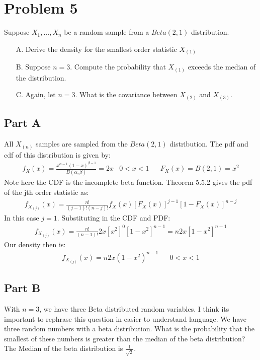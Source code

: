 \documentclass{article}
\begin{document}
\clearpage
\section*{Problem 5}
Suppose $X_1,...,X_n$ be a random sample from a $Beta(2,1)$ distribution.
\begin{enumerate}
\item[A.] Derive the density for the smallest order statistic $X_{(1)}$
\item[B.] Suppose $n = 3$. Compute the probability that $X_{(1)}$ exceeds the median of the distribution.
\item[C.] Again, let $n = 3$. What is the covariance between $X_{(2)}$ and $X_{(3)}$.

\end{enumerate}

\subsection*{Part A}
All $X_{(n)}$ samples are sampled from the $Beta(2,1)$ distribution. The pdf and cdf of this distribution is given by:
\begin{align*}
f_X(x) = \frac{x^{\alpha-1}(1-x)^{\beta-1}}{B(\alpha,\beta)} = 2x & 0<x<1 && F_X(x) = B(2,1) = x^2
\end{align*}
Note here the CDF is the incomplete beta function. Theorem 5.5.2 gives the pdf of the jth order statistic as:
\begin{align*}
f_{X_{(j)}}(x) = \frac{n!}{(j-1)!(n-j)!} f_X(x) [F_X(x)]^{j-1} [1-F_X(x)]^{n-j}
\end{align*}
In this case $j=1$. Substituting in the CDF and PDF:
\begin{align*}
f_{X_{(j)}}(x) = \frac{n!}{(n-1)!} 2x [x^2]^{0} [1-x^2]^{n-1} = n 2x [1-x^2]^{n-1}
\end{align*}
Our density then is:
\begin{align*}
\boxed{ f_{X_{(j)}}(x) = n 2x (1-x^2)^{n-1} } && 0<x<1
\end{align*}
\subsection*{Part B}
With $n=3$, we have three Beta distributed random variables. I think its important to rephrase this question in easier to understand language. We have three random numbers with a beta distribution. What is the probability that the smallest of these numbers is greater than the median of the beta distribution? The Median of the beta distribution is $\tfrac{1}{\sqrt{2}}$.
\end{document}
